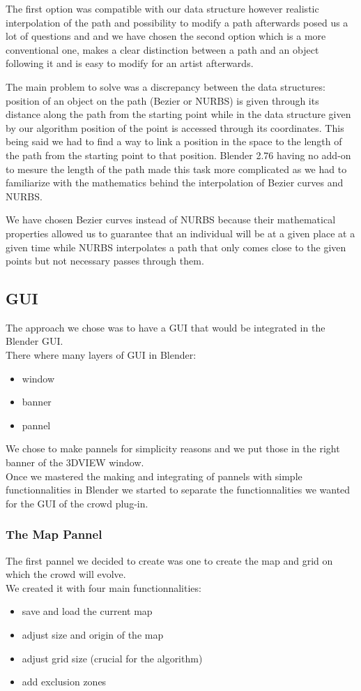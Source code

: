 The first option was compatible with our data structure however realistic interpolation of the path and possibility to modify a path afterwards posed us a lot of questions and and we have chosen the second option which is a more conventional one, makes a clear distinction between a path and an object following it and is easy to modify for an artist afterwards. 

The main problem to solve was a discrepancy between the data structures: position of an object on the path (Bezier or NURBS) is given through its distance along the path from the starting point while in the data structure given by our algorithm position of the point is accessed through its coordinates. This being said we had to find a way to link a position in the space to the length of the path from the starting point to that position. Blender 2.76 having no add-on to mesure the length of the path made this task more complicated as we had to familiarize with the mathematics behind the interpolation of Bezier curves and NURBS.   

We have chosen Bezier curves instead of NURBS because their mathematical properties allowed us to guarantee that an individual will be at a given place at a given time while NURBS interpolates a path that only comes close to the given points but not necessary passes through them.

\subsection{GUI}
The approach we chose was to have a GUI that would be integrated in the Blender GUI.\\
There where many layers of GUI in Blender:
\begin{itemize}
\item window
\item banner
\item pannel
\end{itemize}

We chose to make pannels for simplicity reasons and we put those in the right banner of the 3DVIEW window.\\
Once we mastered the making and integrating of pannels with simple functionnalities in Blender we started to separate the functionnalities we wanted for the GUI of the crowd plug-in.

\subsubsection{The Map Pannel}
The first pannel we decided to create was one to create the map and grid on which the crowd will evolve.\\
We created it with four main functionnalities:
\begin{itemize}
\item save and load the current map
\item adjust size and origin of the map
\item adjust grid size (crucial for the algorithm)
\item add exclusion zones
\end{itemize}


